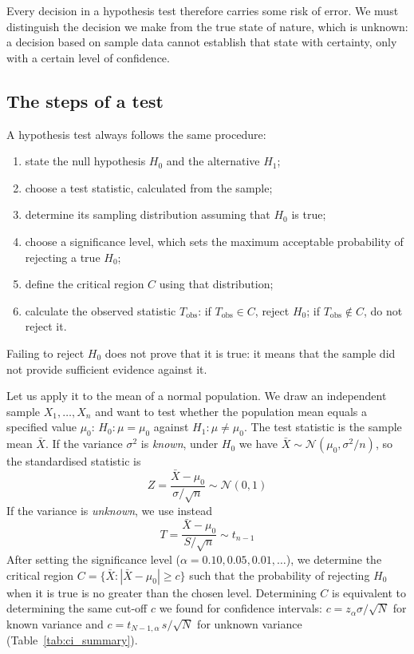 \documentclass[letterpaper,11pt,leqno]{book}
\begin{document}
Every decision in a hypothesis test therefore carries some risk of error. We must distinguish the decision we make from the true state of nature, which is unknown: a decision based on sample data cannot establish that state with certainty, only with a certain level of confidence.

\subsection{The steps of a test}

A hypothesis test always follows the same procedure:
\begin{enumerate}
    \item state the null hypothesis $H_0$ and the alternative $H_1$;
    \item choose a test statistic, calculated from the sample;
    \item determine its sampling distribution assuming that $H_0$ is true;
    \item choose a significance level, which sets the maximum acceptable probability of rejecting a true $H_0$;
    \item define the critical region $C$ using that distribution;
    \item calculate the observed statistic $T_{\text{obs}}$: if $T_{\text{obs}} \in C$, reject $H_0$; if $T_{\text{obs}} \notin C$, do not reject it.
\end{enumerate}
Failing to reject $H_0$ does not prove that it is true: it means that the sample did not provide sufficient evidence against it.

Let us apply it to the mean of a normal population. We draw an independent sample $X_1, \dots, X_n$ and want to test whether the population mean equals a specified value $\mu_0$: $H_0\colon \mu = \mu_0$ against $H_1\colon \mu \neq \mu_0$. The test statistic is the sample mean $\bar{X}$. If the variance $\sigma^2$ is \emph{known}, under $H_0$ we have $\bar{X} \sim \mathcal{N}(\mu_0, \sigma^2/n)$, so the standardised statistic is
\begin{equation}
\boxed{Z = \frac{\bar{X} - \mu_0}{\sigma/\sqrt{n}} \sim \mathcal{N}(0, 1)}
\label{eq:z_test}
\end{equation}
If the variance is \emph{unknown}, we use instead
\begin{equation}
\boxed{T = \frac{\bar{X} - \mu_0}{S/\sqrt{n}} \sim t_{n-1}}
\label{eq:t_test}
\end{equation}
After setting the significance level ($\alpha = 0.10, 0.05, 0.01, \dots$), we determine the critical region $C = \{\bar{X}\colon |\bar{X} - \mu_0| \ge c\}$ such that the probability of rejecting $H_0$ when it is true is no greater than the chosen level. Determining $C$ is equivalent to determining the same cut-off $c$ we found for confidence intervals: $c = z_\alpha\sigma/\sqrt{N}$ for known variance and $c = t_{N-1,\alpha}\,s/\sqrt{N}$ for unknown variance (Table~\ref{tab:ci_summary}).
\end{document}
